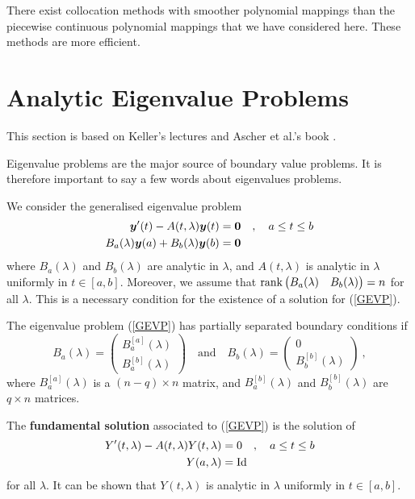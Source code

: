 \begin{rmk}
There exist collocation methods with smoother polynomial mappings than
the piecewise continuous polynomial mappings that we have considered
here.  These methods are more efficient.
\end{rmk}

\section{Analytic Eigenvalue Problems}

This section is based on Keller's lectures \cite{K} and Ascher et
al.'s book \cite{AMR}.

Eigenvalue problems are the major source of boundary value problems.
It is therefore important to say a few words about eigenvalues
problems.

We consider the generalised eigenvalue problem
\begin{equation}  \label{GEVP}
\begin{split}
\bm{y}'(t) - A(t,\lambda)\bm{y}(t) &= \bm{0}
\quad , \quad a \leq t \leq b\\
B_a(\lambda)\bm{y}(a) + B_b(\lambda)\bm{y}(b) &= \bm{0}
\end{split}
\end{equation}
where $B_a(\lambda)$ and $B_b(\lambda)$ are analytic in $\lambda$, and
$A(t,\lambda)$ is analytic in $\lambda$ uniformly in $t \in [a,b]$.
Moreover, we assume that
$\displaystyle \operatorname{rank} \begin{pmatrix} B_a(\lambda) &
B_b(\lambda) \end{pmatrix}= n$ for 
all $\lambda$.  This is a necessary condition for the existence of a
solution for (\ref{GEVP}).

\begin{rmk}
The eigenvalue problem (\ref{GEVP}) has partially separated boundary
conditions if
\[
B_a(\lambda) = \begin{pmatrix}
B_a^{[a]}(\lambda) \\ B_a^{[b]}(\lambda)
\end{pmatrix} \quad \text{and} \quad
B_b(\lambda) = \begin{pmatrix}
0 \\ B_b^{[b]}(\lambda)
\end{pmatrix} \ ,
\]
where $B_a^{[a]}(\lambda)$ is a $(n-q)\times n$ matrix, and
$B_a^{[b]}(\lambda)$ and $B_b^{[b]}(\lambda)$ are $q\times n$ matrices.
\label{PSBC_GEVP}
\end{rmk}

The {\bfseries fundamental solution} associated to (\ref{GEVP}) is the 
solution of
\[
\begin{split}
Y'(t,\lambda) - A(t,\lambda)Y(t,\lambda) &= 0
\quad , \quad a \leq t \leq b\\
Y(a,\lambda) &= \operatorname{Id}
\end{split}
\]
for all $\lambda$.  It can be shown that $Y(t,\lambda)$ is analytic
in $\lambda$ uniformly in $t \in [a,b]$.

